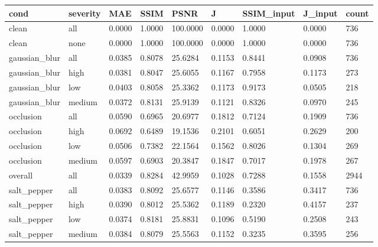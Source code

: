 \begin{tabular}{lllllllll}
\hline
cond & severity & MAE & SSIM & PSNR & J & SSIM\_input & J\_input & count \\
\hline
clean & all & 0.0000 & 1.0000 & 100.0000 & 0.0000 & 1.0000 & 0.0000 & 736 \\
clean & none & 0.0000 & 1.0000 & 100.0000 & 0.0000 & 1.0000 & 0.0000 & 736 \\
gaussian\_blur & all & 0.0385 & 0.8078 & 25.6284 & 0.1153 & 0.8441 & 0.0908 & 736 \\
gaussian\_blur & high & 0.0381 & 0.8047 & 25.6055 & 0.1167 & 0.7958 & 0.1173 & 273 \\
gaussian\_blur & low & 0.0403 & 0.8058 & 25.3362 & 0.1173 & 0.9173 & 0.0505 & 218 \\
gaussian\_blur & medium & 0.0372 & 0.8131 & 25.9139 & 0.1121 & 0.8326 & 0.0970 & 245 \\
occlusion & all & 0.0590 & 0.6965 & 20.6977 & 0.1812 & 0.7124 & 0.1909 & 736 \\
occlusion & high & 0.0692 & 0.6489 & 19.1536 & 0.2101 & 0.6051 & 0.2629 & 200 \\
occlusion & low & 0.0506 & 0.7382 & 22.1564 & 0.1562 & 0.8026 & 0.1304 & 269 \\
occlusion & medium & 0.0597 & 0.6903 & 20.3847 & 0.1847 & 0.7017 & 0.1978 & 267 \\
overall & all & 0.0339 & 0.8284 & 42.9959 & 0.1028 & 0.7288 & 0.1558 & 2944 \\
salt\_pepper & all & 0.0383 & 0.8092 & 25.6577 & 0.1146 & 0.3586 & 0.3417 & 736 \\
salt\_pepper & high & 0.0390 & 0.8012 & 25.5362 & 0.1189 & 0.2320 & 0.4157 & 237 \\
salt\_pepper & low & 0.0374 & 0.8181 & 25.8831 & 0.1096 & 0.5190 & 0.2508 & 243 \\
salt\_pepper & medium & 0.0384 & 0.8079 & 25.5563 & 0.1152 & 0.3235 & 0.3595 & 256 \\
\hline
\end{tabular}
